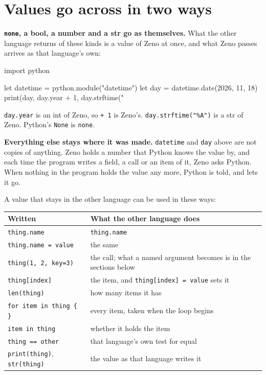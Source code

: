\section{Values go across in two ways}

\textbf{\texttt{none}, a bool, a number and a str go as themselves.}
What the other language returns of these kinds is a value of Zeno at
once, and what Zeno passes arrives as that language's own:

\begin{zeno}[file=day.zeno, dir=python]
import python

let datetime = python.module("datetime")
let day = datetime.date(2026, 11, 18)
print(day, day.year + 1, day.strftime("%
\end{zeno}

\verb|day.year| is an int of Zeno, so \verb|+ 1| is Zeno's.
\verb|day.strftime("%A")| is a str of Zeno. Python's \verb|None| is
\verb|none|.

\textbf{Everything else stays where it was made.} \verb|datetime| and
\verb|day| above are not copies of anything. Zeno holds a number that
Python knows the value by, and each time the program writes a field, a
call or an item of it, Zeno asks Python. When nothing in the program
holds the value any more, Python is told, and lets it go.

A value that stays in the other language can be used in these ways:

\begin{center}
\begin{tabular}{lP{6.8cm}}
\toprule
Written & What the other language does \\
\midrule
\verb|thing.name| & \verb|thing.name| \\
\verb|thing.name = value| & the same \\
\verb|thing(1, 2, key=3)| & the call; what a named argument becomes is
  in the sections below \\
\verb|thing[index]| & the item, and \verb|thing[index] = value| sets it \\
\verb|len(thing)| & how many items it has \\
\verb|for item in thing { }| & every item, taken when the loop begins \\
\verb|item in thing| & whether it holds the item \\
\verb|thing == other| & that language's own test for equal \\
\verb|print(thing)|, \verb|str(thing)| & the value as that language writes it \\
\bottomrule
\end{tabular}
\end{center}

